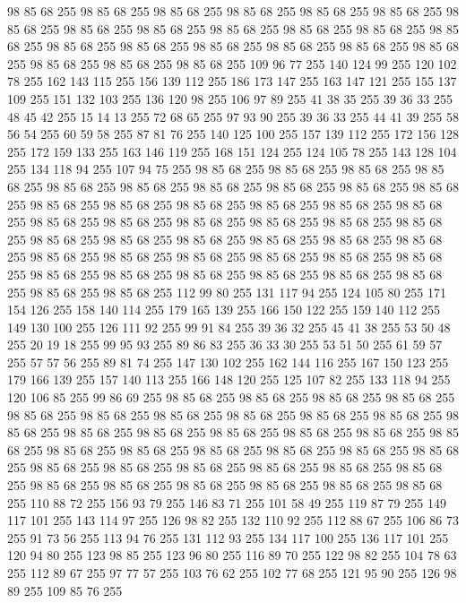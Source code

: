 98 85 68 255 98 85 68 255 98 85 68 255 98 85 68 255 98 85 68 255 98 85 68 255 98 85 68 255 98 85 68 255 98 85 68 255 98 85 68 255 98 85 68 255 98 85 68 255 98 85 68 255 98 85 68 255 98 85 68 255 98 85 68 255 98 85 68 255 98 85 68 255 98 85 68 255 98 85 68 255 98 85 68 255 98 85 68 255 109 96 77 255 140 124 99 255 120 102 78 255 162 143 115 255 156 139 112 255 186 173 147 255 163 147 121 255 155 137 109 255 151 132 103 255 136 120 98 255 106 97 89 255 41 38 35 255 39 36 33 255 48 45 42 255 15 14 13 255 72 68 65 255 97 93 90 255 39 36 33 255 44 41 39 255 58 56 54 255 60 59 58 255 87 81 76 255 140 125 100 255 157 139 112 255 172 156 128 255 172 159 133 255 163 146 119 255 168 151 124 255 124 105 78 255 143 128 104 255 134 118 94 255 107 94 75 255 98 85 68 255 98 85 68 255 98 85 68 255 98 85 68 255 98 85 68 255 98 85 68 255 98 85 68 255 98 85 68 255 98 85 68 255 98 85 68 255
98 85 68 255 98 85 68 255 98 85 68 255 98 85 68 255 98 85 68 255 98 85 68 255 98 85 68 255 98 85 68 255 98 85 68 255 98 85 68 255 98 85 68 255 98 85 68 255 98 85 68 255 98 85 68 255 98 85 68 255 98 85 68 255 98 85 68 255 98 85 68 255 98 85 68 255 98 85 68 255 98 85 68 255 98 85 68 255 98 85 68 255 98 85 68 255 98 85 68 255 98 85 68 255 98 85 68 255 98 85 68 255 98 85 68 255 98 85 68 255 98 85 68 255 98 85 68 255 112 99 80 255 131 117 94 255 124 105 80 255 171 154 126 255 158 140 114 255 179 165 139 255 166 150 122 255 159 140 112 255 149 130 100 255 126 111 92 255 99 91 84 255 39 36 32 255 45 41 38 255 53 50 48 255 20 19 18 255 99 95 93 255 89 86 83 255 36 33 30 255 53 51 50 255 61 59 57 255 57 57 56 255 89 81 74 255 147 130 102 255 162 144 116 255 167 150 123 255 179 166 139 255 157 140 113 255 166 148 120 255 125 107 82 255 133 118 94 255 120 106 85 255 99 86 69 255
98 85 68 255 98 85 68 255 98 85 68 255 98 85 68 255 98 85 68 255 98 85 68 255 98 85 68 255 98 85 68 255 98 85 68 255 98 85 68 255 98 85 68 255 98 85 68 255 98 85 68 255 98 85 68 255 98 85 68 255 98 85 68 255 98 85 68 255 98 85 68 255 98 85 68 255 98 85 68 255 98 85 68 255 98 85 68 255 98 85 68 255 98 85 68 255 98 85 68 255 98 85 68 255 98 85 68 255 98 85 68 255 98 85 68 255 98 85 68 255 98 85 68 255 98 85 68 255 98 85 68 255 98 85 68 255 98 85 68 255 110 88 72 255 156 93 79 255 146 83 71 255 101 58 49 255 119 87 79 255 149 117 101 255 143 114 97 255 126 98 82 255 132 110 92 255 112 88 67 255 106 86 73 255 91 73 56 255 113 94 76 255 131 112 93 255 134 117 100 255 136 117 101 255 120 94 80 255 123 98 85 255 123 96 80 255 116 89 70 255 122 98 82 255 104 78 63 255 112 89 67 255 97 77 57 255 103 76 62 255 102 77 68 255 121 95 90 255 126 98 89 255 109 85 76 255
